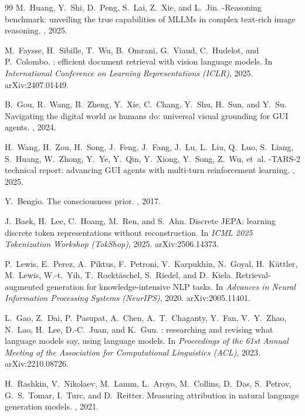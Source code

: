\documentclass[11pt]{article}
\begin{document}
\begin{thebibliography}{99}
M.~Huang, Y.~Shi, D.~Peng, S.~Lai, Z.~Xie, and L.~Jin.
-{R}easoning benchmark: unveiling the true capabilities of {MLLMs} in complex text-rich image reasoning.
, 2025.

M.~Faysse, H.~Sibille, T.~Wu, B.~Omrani, G.~Viaud, C.~Hudelot, and P.~Colombo.
: efficient document retrieval with vision language models.
\newblock In {\em International Conference on Learning Representations ({ICLR})}, 2025.
\newblock arXiv:2407.01449.

B.~Gou, R.~Wang, B.~Zheng, Y.~Xie, C.~Chang, Y.~Shu, H.~Sun, and Y.~Su.
\newblock Navigating the digital world as humans do: universal visual grounding for {GUI} agents.
, 2024.

H.~Wang, H.~Zou, H.~Song, J.~Feng, J.~Fang, J.~Lu, L.~Liu, Q.~Luo, S.~Liang, S.~Huang, W.~Zhong, Y.~Ye, Y.~Qin, Y.~Xiong, Y.~Song, Z.~Wu, et~al.
-{TARS}-2 technical report: advancing {GUI} agents with multi-turn reinforcement learning.
, 2025.

Y.~Bengio.
\newblock The consciousness prior.
, 2017.

J.~Baek, H.~Lee, C.~Hoang, M.~Ren, and S.~Ahn.
\newblock Discrete {JEPA}: learning discrete token representations without reconstruction.
\newblock In {\em ICML 2025 Tokenization Workshop ({TokShop})}, 2025.
\newblock arXiv:2506.14373.

P.~Lewis, E.~Perez, A.~Piktus, F.~Petroni, V.~Karpukhin, N.~Goyal, H.~K\"uttler, M.~Lewis, W.-t.~Yih, T.~Rockt\"aschel, S.~Riedel, and D.~Kiela.
\newblock Retrieval-augmented generation for knowledge-intensive {NLP} tasks.
\newblock In {\em Advances in Neural Information Processing Systems ({NeurIPS})}, 2020.
\newblock arXiv:2005.11401.

L.~Gao, Z.~Dai, P.~Pasupat, A.~Chen, A.~T.~Chaganty, Y.~Fan, V.~Y.~Zhao, N.~Lao, H.~Lee, D.-C.~Juan, and K.~Guu.
: researching and revising what language models say, using language models.
\newblock In {\em Proceedings of the 61st Annual Meeting of the Association for Computational Linguistics ({ACL})}, 2023.
\newblock arXiv:2210.08726.

H.~Rashkin, V.~Nikolaev, M.~Lamm, L.~Aroyo, M.~Collins, D.~Das, S.~Petrov, G.~S.~Tomar, I.~Turc, and D.~Reitter.
\newblock Measuring attribution in natural language generation models.
, 2021.


\end{thebibliography}
\end{document}
